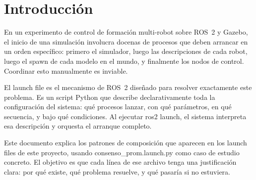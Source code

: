 \section{Introducción}

En un experimento de control de formación multi-robot sobre ROS~2 y Gazebo, el inicio de una simulación involucra docenas de procesos que deben arrancar en un orden específico: primero el simulador, luego las descripciones de cada robot, luego el spawn de cada modelo en el mundo, y finalmente los nodos de control. Coordinar esto manualmente es inviable.

El launch file es el mecanismo de ROS~2 diseñado para resolver exactamente este problema. Es un script Python que describe declarativamente toda la configuración del sistema: qué procesos lanzar, con qué parámetros, en qué secuencia, y bajo qué condiciones. Al ejecutar ros2 launch, el sistema interpreta esa descripción y orquesta el arranque completo.

Este documento explica los patrones de composición que aparecen en los launch files de este proyecto, usando consenso\_prom.launch.py como caso de estudio concreto. El objetivo es que cada línea de ese archivo tenga una justificación clara: por qué existe, qué problema resuelve, y qué pasaría si no estuviera.

